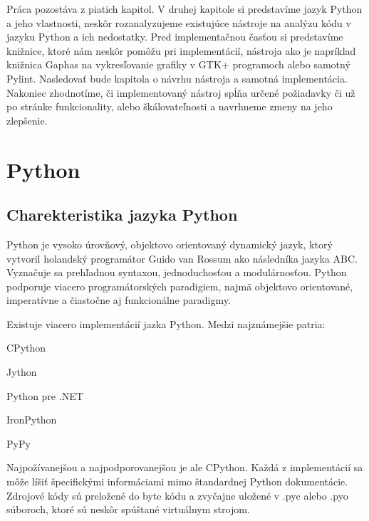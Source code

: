 \documentclass[11pt,oneside,final]{fithesis2}
\begin{document}
	Práca pozostáva z piatich kapitol. V druhej kapitole si predstavíme jazyk Python a jeho vlastnosti, neskôr rozanalyzujeme existujúce nástroje na analýzu kódu v jazyku Python a ich nedostatky. Pred implementačnou časťou si predstavíme knižnice, ktoré nám neskôr pomôžu pri implementácií, nástroja ako je napríklad knižnica Gaphas na vykresľovanie grafiky v GTK+ programoch alebo samotný Pylint. Nasledovať bude kapitola o návrhu nástroja a samotná implementácia. Nakoniec zhodnotíme, či implementovaný nástroj spĺňa určené požiadavky či už po stránke funkcionality, alebo škálovateľnosti a navrhneme zmeny na jeho zlepšenie.
 


%
%
%

\chapter{Python}

	\section{Charekteristika jazyka Python}
	Python je vysoko úrovňový, objektovo orientovaný dynamický jazyk, ktorý vytvoril holandský programátor Guido van Rossum ako následníka jazyka ABC.
Vyznačuje sa prehľadnou syntaxou, jednoduchosťou a modulárnosťou. Python podporuje viacero programátorských paradigiem, najmä objektovo orientované, imperatívne a čiastočne aj funkcionálne paradigmy.

Existuje viacero implementácií jazka Python. Medzi najznámejšie patria:
\begin{list}{•}{}
\item CPython
\item Jython
\item Python pre .NET
\item IronPython
\item PyPy
\end{list}

Najpožívanejšou a najpodporovanejšou je ale CPython. Každá z implementácií sa môže líšiť špecifickými informáciami mimo štandardnej Python dokumentácie.
Zdrojové kódy sú preložené do byte kódu a zvyčajne uložené v .pyc alebo .pyo súboroch, ktoré sú neskôr spúštané virtuálnym strojom.
\end{document}

